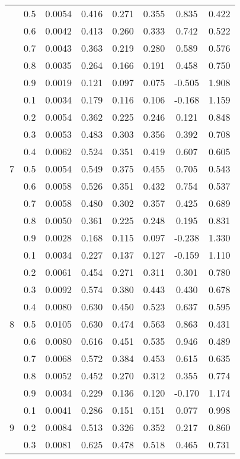 \documentclass[11pt,a4paper]{report}
\begin{document}
\begin{longtable}{ | c | c || c | c | c | c | c | c | }
 & 0.5 & 0.0054 & 0.416 & 0.271 & 0.355 & 0.835 & 0.422 \\
 & 0.6 & 0.0042 & 0.413 & 0.260 & 0.333 & 0.742 & 0.522 \\
 & 0.7 & 0.0043 & 0.363 & 0.219 & 0.280 & 0.589 & 0.576 \\
 & 0.8 & 0.0035 & 0.264 & 0.166 & 0.191 & 0.458 & 0.750 \\
 & 0.9 & 0.0019 & 0.121 & 0.097 & 0.075 & -0.505 & 1.908 \\
 \hline
\multirow{9}{*}{7} & 0.1 & 0.0034 & 0.179 & 0.116 & 0.106 & -0.168 & 1.159 \\
 & 0.2 & 0.0054 & 0.362 & 0.225 & 0.246 & 0.121 & 0.848 \\
 & 0.3 & 0.0053 & 0.483 & 0.303 & 0.356 & 0.392 & 0.708 \\
 & 0.4 & 0.0062 & 0.524 & 0.351 & 0.419 & 0.607 & 0.605 \\
 & 0.5 & 0.0054 & 0.549 & 0.375 & 0.455 & 0.705 & 0.543 \\
 & 0.6 & 0.0058 & 0.526 & 0.351 & 0.432 & 0.754 & 0.537 \\
 & 0.7 & 0.0058 & 0.480 & 0.302 & 0.357 & 0.425 & 0.689 \\
 & 0.8 & 0.0050 & 0.361 & 0.225 & 0.248 & 0.195 & 0.831 \\
 & 0.9 & 0.0028 & 0.168 & 0.115 & 0.097 & -0.238 & 1.330 \\
 \hline
\multirow{9}{*}{8} & 0.1 & 0.0034 & 0.227 & 0.137 & 0.127 & -0.159 & 1.110 \\
 & 0.2 & 0.0061 & 0.454 & 0.271 & 0.311 & 0.301 & 0.780 \\
 & 0.3 & 0.0092 & 0.574 & 0.380 & 0.443 & 0.430 & 0.678 \\
 & 0.4 & 0.0080 & 0.630 & 0.450 & 0.523 & 0.637 & 0.595 \\
 & 0.5 & 0.0105 & 0.630 & 0.474 & 0.563 & 0.863 & 0.431 \\
 & 0.6 & 0.0080 & 0.616 & 0.451 & 0.535 & 0.946 & 0.489 \\
 & 0.7 & 0.0068 & 0.572 & 0.384 & 0.453 & 0.615 & 0.635 \\
 & 0.8 & 0.0052 & 0.452 & 0.270 & 0.312 & 0.355 & 0.774 \\
 & 0.9 & 0.0034 & 0.229 & 0.136 & 0.120 & -0.170 & 1.174 \\
 \hline
\multirow{9}{*}{9} & 0.1 & 0.0041 & 0.286 & 0.151 & 0.151 & 0.077 & 0.998 \\
 & 0.2 & 0.0084 & 0.513 & 0.326 & 0.352 & 0.217 & 0.860 \\
 & 0.3 & 0.0081 & 0.625 & 0.478 & 0.518 & 0.465 & 0.731 \\

\end{longtable}
\end{document}
